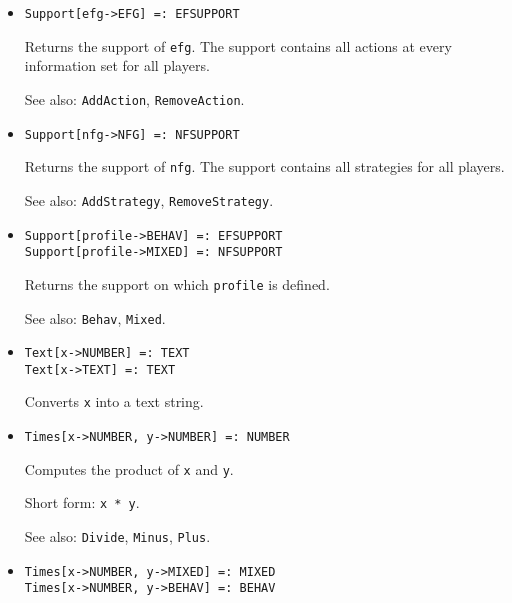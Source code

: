 \begin{itemize}
\item{}
\protect \large \begin{verbatim}
Support[efg->EFG] =: EFSUPPORT 
\end{verbatim}\normalsize

\bd
Returns the support of \verb+efg+.  The support contains all actions at every
information set for all players.
\item [See also:] \verb+AddAction+, \verb+RemoveAction+.
\ed

\item{}
\protect \large \begin{verbatim}
Support[nfg->NFG] =: NFSUPPORT 
\end{verbatim}\normalsize

\bd
Returns the support of \verb+nfg+.  The support contains all strategies
for all players.
\item [See also:] \verb+AddStrategy+, \verb+RemoveStrategy+.
\ed

\item{}
\protect \large \begin{verbatim}
Support[profile->BEHAV] =: EFSUPPORT 
Support[profile->MIXED] =: NFSUPPORT 
\end{verbatim}\normalsize

\bd
Returns the support on which \verb+profile+ is defined.
\item [See also:] \verb+Behav+, \verb+Mixed+.
\ed


\item{}
\protect \large \begin{verbatim}
Text[x->NUMBER] =: TEXT 
Text[x->TEXT] =: TEXT 
\end{verbatim} \normalsize

\bd
Converts \verb+x+ into a text string.
\ed

\item{} 
\protect \large \begin{verbatim}
Times[x->NUMBER, y->NUMBER] =: NUMBER 
\end{verbatim} \normalsize

\bd
Computes the product of \verb+x+ and \verb+y+.
\item [Short form:] \verb+x * y+.
\item [See also:] \verb+Divide+, \verb+Minus+, \verb+Plus+.
\ed

\item{}
\protect \large \begin{verbatim}
Times[x->NUMBER, y->MIXED] =: MIXED 
Times[x->NUMBER, y->BEHAV] =: BEHAV 
\end{verbatim} \normalsize


\end{itemize}
